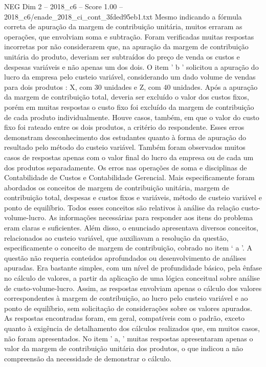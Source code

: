 \begin{textsample}{NEG Dim 2 – 2018\_c6 – Score 1.00 – 2018\_c6/enade\_2018\_ci\_cont\_3fded95eb1.txt}
Mesmo indicando a fórmula correta de apuração da margem de contribuição unitária, muitos erraram as operações, que envolviam soma e subtração.
Foram verificadas muitas respostas incorretas por não considerarem que, na apuração da margem de contribuição unitária do produto, deveriam ser subtraídos do preço de venda os custos e despesas variáveis e não apenas um dos dois.
O item ' b ' solicitou a apuração do lucro da empresa pelo custeio variável, considerando um dado volume de vendas para dois produtos : X, com 30 unidades e Z, com 40 unidades.
Após a apuração da margem de contribuição total, deveria ser excluído o valor dos custos fixos, porém em muitas respostas o custo fixo foi excluído da margem de contribuição de cada produto individualmente.
Houve casos, também, em que o valor do custo fixo foi rateado entre os dois produtos, a critério do respondente.
Esses erros demonstram desconhecimento dos estudantes quanto à forma de apuração do resultado pelo método do custeio variável.
Também foram observados muitos casos de respostas apenas com o valor final do lucro da empresa ou de cada um dos produtos separadamente.
Os erros nas operações de soma e disciplinas de Contabilidade de Custos e Contabilidade Gerencial.
Mais especificamente foram abordados os conceitos de margem de contribuição unitária, margem de contribuição total, despesas e custos fixos e variáveis, método de custeio variável e ponto de equilíbrio.
Todos esses conceitos são relativos à análise da relação custo-volume-lucro.
As informações necessárias para responder aos itens do problema eram claras e suficientes.
Além disso, o enunciado apresentava diversos conceitos, relacionados ao custeio variável, que auxiliavam a resolução da questão, especificamente o conceito de margem de contribuição, cobrado no item ‘ a ’.
A questão não requeria conteúdos aprofundados ou desenvolvimento de análises apuradas.
Era bastante simples, com um nível de profundidade básico, pela ênfase no cálculo de valores, a partir da aplicação de uma lógica conceitual sobre análise de custo-volume-lucro.
Assim, as respostas envolviam apenas o cálculo dos valores correspondentes à margem de contribuição, ao lucro pelo custeio variável e ao ponto de equilíbrio, sem solicitação de considerações sobre os valores apurados.
As respostas encontradas foram, em geral, compatíveis com o padrão, exceto quanto à exigência de detalhamento dos cálculos realizados que, em muitos casos, não foram apresentados.
No item ' a, ' muitas respostas apresentaram apenas o valor da margem de contribuição unitária dos produtos, o que indicou a não compreensão da necessidade de demonstrar o cálculo.

\end{textsample}
